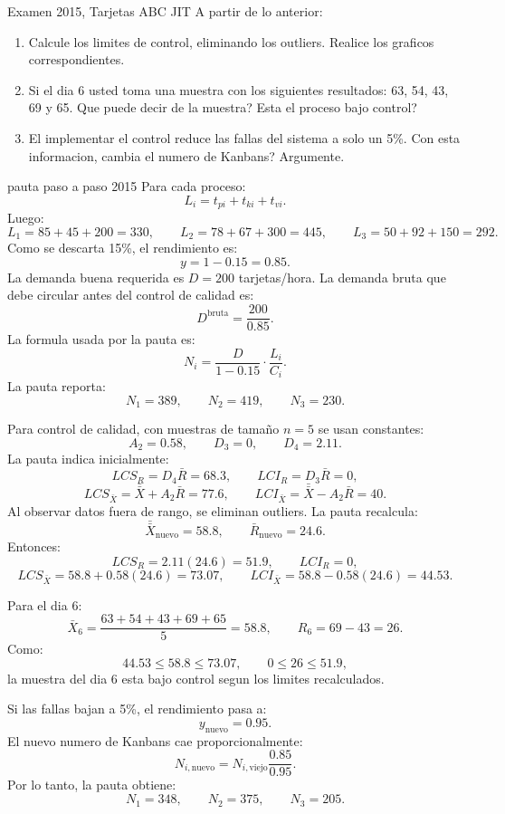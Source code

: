 \begin{enunciado}{Examen 2015, Tarjetas ABC JIT}
A partir de lo anterior:
\begin{enumerate}[label=\alph*),resume]
  \item Calcule los limites de control, eliminando los outliers. Realice los graficos correspondientes.
  \item Si el dia 6 usted toma una muestra con los siguientes resultados: 63, 54, 43, 69 y 65. Que puede decir de la muestra? Esta el proceso bajo control?
  \item El implementar el control reduce las fallas del sistema a solo un 5\%. Con esta informacion, cambia el numero de Kanbans? Argumente.
\end{enumerate}
\end{enunciado}

\begin{pautacompleta}{pauta paso a paso 2015}
Para cada proceso:
\[
  L_i=t_{pi}+t_{ki}+t_{vi}.
\]
Luego:
\[
  L_1=85+45+200=330,\qquad
  L_2=78+67+300=445,\qquad
  L_3=50+92+150=292.
\]
Como se descarta 15\%, el rendimiento es:
\[
  y=1-0.15=0.85.
\]
La demanda buena requerida es $D=200$ tarjetas/hora. La demanda bruta que debe circular antes del control de calidad es:
\[
  D^{\text{bruta}}=\frac{200}{0.85}.
\]
La formula usada por la pauta es:
\[
  N_i=\frac{D}{1-0.15}\cdot \frac{L_i}{C_i}.
\]
La pauta reporta:
\[
  N_1=389,\qquad N_2=419,\qquad N_3=230.
\]

Para control de calidad, con muestras de tamaño $n=5$ se usan constantes:
\[
  A_2=0.58,\qquad D_3=0,\qquad D_4=2.11.
\]
La pauta indica inicialmente:
\[
  LCS_R=D_4\bar R=68.3,\qquad
  LCI_R=D_3\bar R=0,
\]
\[
  LCS_{\bar X}=\bar{\bar X}+A_2\bar R=77.6,\qquad
  LCI_{\bar X}=\bar{\bar X}-A_2\bar R=40.
\]
Al observar datos fuera de rango, se eliminan outliers. La pauta recalcula:
\[
  \bar{\bar X}_{\text{nuevo}}=58.8,\qquad
  \bar R_{\text{nuevo}}=24.6.
\]
Entonces:
\[
  LCS_R=2.11(24.6)=51.9,\qquad LCI_R=0,
\]
\[
  LCS_{\bar X}=58.8+0.58(24.6)=73.07,
  \qquad
  LCI_{\bar X}=58.8-0.58(24.6)=44.53.
\]

Para el dia 6:
\[
  \bar X_6=\frac{63+54+43+69+65}{5}=58.8,
  \qquad
  R_6=69-43=26.
\]
Como:
\[
  44.53\leq 58.8\leq 73.07,
  \qquad
  0\leq 26\leq 51.9,
\]
la muestra del dia 6 esta bajo control segun los limites recalculados.

Si las fallas bajan a 5\%, el rendimiento pasa a:
\[
  y_{\text{nuevo}}=0.95.
\]
El nuevo numero de Kanbans cae proporcionalmente:
\[
  N_{i,\text{nuevo}}=N_{i,\text{viejo}}\frac{0.85}{0.95}.
\]
Por lo tanto, la pauta obtiene:
\[
  N_1=348,\qquad N_2=375,\qquad N_3=205.
\]
\end{pautacompleta}


